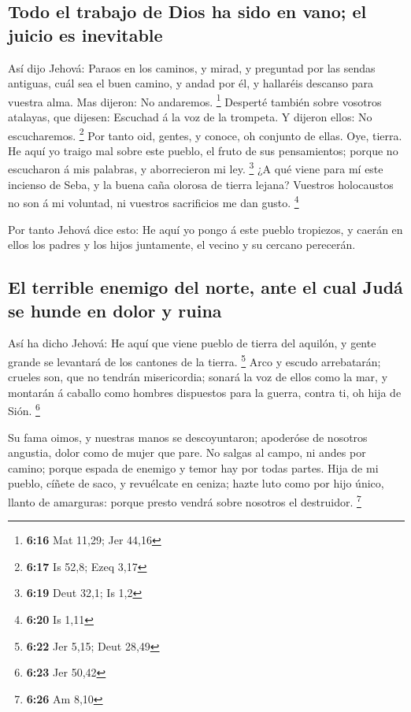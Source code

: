 \hypertarget{todo-el-trabajo-de-dios-ha-sido-en-vano-el-juicio-es-inevitable}{%
\subsection{Todo el trabajo de Dios ha sido en vano; el juicio es
inevitable}\label{todo-el-trabajo-de-dios-ha-sido-en-vano-el-juicio-es-inevitable}}

 Así dijo Jehová: Paraos en los caminos, y mirad, y
preguntad por las sendas antiguas, cuál sea el buen camino, y andad por
él, y hallaréis descanso para vuestra alma. Mas dijeron: No andaremos.
\footnote{\textbf{6:16} Mat 11,29; Jer 44,16}  Desperté
también sobre vosotros atalayas, que dijesen: Escuchad á la voz de la
trompeta. Y dijeron ellos: No escucharemos. \footnote{\textbf{6:17} Is
  52,8; Ezeq 3,17}  Por tanto oid, gentes, y conoce, oh
conjunto de ellas.  Oye, tierra. He aquí yo traigo mal
sobre este pueblo, el fruto de sus pensamientos; porque no escucharon á
mis palabras, y aborrecieron mi ley. \footnote{\textbf{6:19} Deut 32,1;
  Is 1,2}  ¿A qué viene para mí este incienso de Seba, y
la buena caña olorosa de tierra lejana? Vuestros holocaustos no son á mi
voluntad, ni vuestros sacrificios me dan gusto. \footnote{\textbf{6:20}
  Is 1,11}

 Por tanto Jehová dice esto: He aquí yo pongo á este
pueblo tropiezos, y caerán en ellos los padres y los hijos juntamente,
el vecino y su cercano perecerán.

\hypertarget{el-terrible-enemigo-del-norte-ante-el-cual-juduxe1-se-hunde-en-dolor-y-ruina}{%
\subsection{El terrible enemigo del norte, ante el cual Judá se hunde en
dolor y
ruina}\label{el-terrible-enemigo-del-norte-ante-el-cual-juduxe1-se-hunde-en-dolor-y-ruina}}

 Así ha dicho Jehová: He aquí que viene pueblo de tierra
del aquilón, y gente grande se levantará de los cantones de la tierra.
\footnote{\textbf{6:22} Jer 5,15; Deut 28,49}  Arco y
escudo arrebatarán; crueles son, que no tendrán misericordia; sonará la
voz de ellos como la mar, y montarán á caballo como hombres dispuestos
para la guerra, contra ti, oh hija de Sión. \footnote{\textbf{6:23} Jer
  50,42}

 Su fama oimos, y nuestras manos se descoyuntaron;
apoderóse de nosotros angustia, dolor como de mujer que pare.
 No salgas al campo, ni andes por camino; porque espada
de enemigo y temor hay por todas partes.  Hija de mi
pueblo, cíñete de saco, y revuélcate en ceniza; hazte luto como por hijo
único, llanto de amarguras: porque presto vendrá sobre nosotros el
destruidor. \footnote{\textbf{6:26} Am 8,10}

